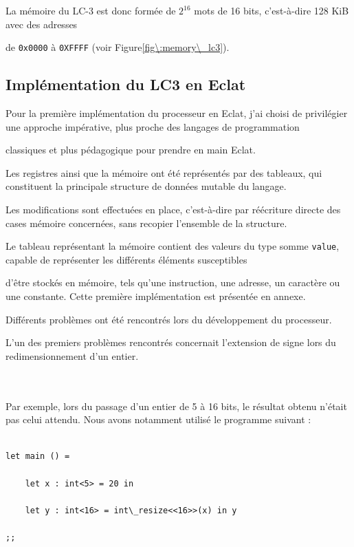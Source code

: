 \documentclass{article}
\begin{document}
La mémoire du LC-3 est donc formée de $2^{16}$ mots de 16 bits, c’est-à-dire 128 KiB avec des adresses

de \texttt{0x0000} à \texttt{0XFFFF} (voir Figure\~\ref{fig\:memory\_lc3}).


\subsection{Implémentation du LC3 en Eclat}

Pour la première implémentation du processeur en Eclat, j'ai choisi de privilégier une approche impérative, plus proche des langages de programmation 

classiques et plus pédagogique pour prendre en main Eclat.

Les registres ainsi que la mémoire ont été représentés par des tableaux, qui constituent la principale structure de données mutable du langage. 

Les modifications sont effectuées en place, c'est-à-dire par réécriture directe des cases mémoire concernées, sans recopier l'ensemble de la structure.

Le tableau représentant la mémoire contient des valeurs du type somme \texttt{value}, capable de représenter les différents éléments susceptibles 

d'être stockés en mémoire, tels qu'une instruction, une adresse, un caractère ou une constante. Cette première implémentation est présentée en annexe.

Différents problèmes ont été rencontrés lors du développement du processeur.

L'un des premiers problèmes rencontrés concernait l'extension de signe lors du redimensionnement d'un entier. 

\\\\

Par exemple, lors du passage d'un entier de 5 à 16 bits, le résultat obtenu n'était pas celui attendu. Nous avons notamment utilisé le programme suivant :

\begin{lstlisting}

let main () =

    let x : int<5> = 20 in

    let y : int<16> = int\_resize<<16>>(x) in y

;;

\end{lstlisting}
\end{document}
